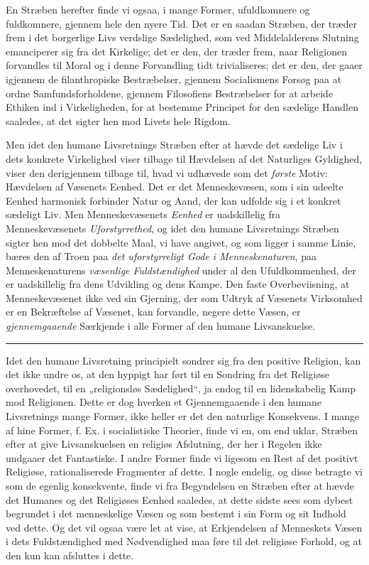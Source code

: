 \documentclass[12pt,a4paper,openany]{book}
\newcommand{\opage}[1]{\marginnote{\footnotesize\textit{[#1]}}}
\begin{document}
\opage{497}En Stræben herefter finde vi ogsaa, i mange Former,
ufuldkomnere og fuldkomnere, gjennem hele den nyere Tid.
Det er en saadan Stræben, der træder frem i det borgerlige
Livs verdslige Sædelighed, som ved Middelalderens Slutning
emanciperer sig fra det Kirkelige; det er den, der træder frem,
naar Religionen forvandles til Moral og i denne Forvandling
tidt trivialiseres; det er den, der gaaer igjennem de filanthropiske
Bestræbelser, gjennem Socialismens Forsøg paa at
ordne Samfundsforholdene, gjennem Filosofiens Bestræbelser
for at arbeide Ethiken ind i Virkeligheden, for at bestemme
Principet for den sædelige Handlen saaledes, at det sigter
hen mod Livets hele Rigdom.

Men idet den humane Livsretnings Stræben efter at hævde
det sædelige Liv i dets konkrete Virkelighed viser tilbage til
Hævdelsen af det Naturliges Gyldighed, viser den derigjennem
tilbage til, hvad vi udhævede som det \emph{første} Motiv: Hævdelsen
af Væsenets Eenhed. Det er det Menneskevæsen, som i sin
udeelte Eenhed harmonisk forbinder Natur og Aand, der kan
udfolde sig i et konkret sædeligt Liv. Men Menneskevæsenets
\emph{Eenhed} er uadskillelig fra Menneskevæsenets \emph{Uforstyrrethed},
og idet den humane Livsretnings Stræben sigter hen mod
det dobbelte Maal, vi have angivet, og som ligger i samme
Linie, bæres den af Troen paa \emph{det uforstyrreligt Gode
i Menneskenaturen}, paa Menneskenaturens \emph{væsenlige
Fuldstændighed} under al den Ufuldkommenhed, der er
uadskillelig fra dens Udvikling og dens Kampe. Den faste
Overbeviisning, at Menneskevæsenet ikke ved sin Gjerning, der
som Udtryk af Væsenets Virksomhed er en Bekræftelse af
Væsenet, kan forvandle, negere dette Væsen, er \emph{gjennemgaaende}
Særkjende i alle Former af den humane Livsanskuelse.

\begin{center}\rule{1.8cm}{0.4pt}\end{center}

Idet den humane Livsretning principielt sondrer sig fra
den positive Religion, kan det ikke undre os, at den hyppigt
har ført til en Sondring fra det Religiøse overhovedet, til
\opage{498}en „religionsløs Sædelighed“, ja endog til en lidenskabelig
Kamp mod Religionen. Dette er dog hverken et Gjennemgaaende
i den humane Livsretnings mange Former, ikke heller
er det den naturlige Konsekvens. I mange af hine Former,
f. Ex. i socialistiske Theorier, finde vi en, om end uklar,
Stræben efter at give Livsanskuelsen en religiøs Afslutning,
der her i Regelen ikke undgaaer det Fantastiske. I andre Former
finde vi ligesom en Rest af det positivt Religiøse, rationaliserede
Fragmenter af dette. I nogle endelig, og disse betragte vi
som de egenlig konsekvente, finde vi fra Begyndelsen en
Stræben efter at hævde det Humanes og det Religiøses Eenhed
saaledes, at dette sidste sees som dybest begrundet i det menneskelige
Væsen og som bestemt i sin Form og sit Indhold ved dette.
Og det vil ogsaa være let at vise, at Erkjendelsen af Menneskets
Væsen i dets Fuldstændighed med Nødvendighed maa føre
til det religiøse Forhold, og at den kun kan afsluttes i dette.
\end{document}
